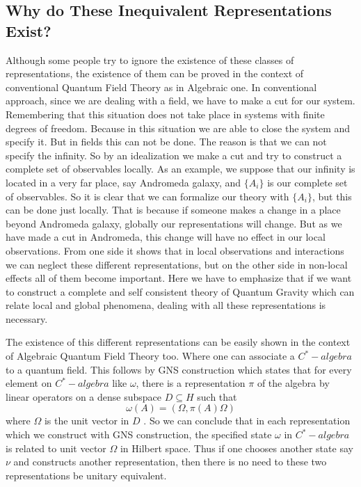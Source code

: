 \documentclass[12pt]{article}
\begin{document}
\subsection{Why do These Inequivalent Representations Exist?}\label{subsection.why UIR exist}
Although some people try to ignore the existence of these classes of representations, the existence of them can be proved in the context of conventional Quantum Field Theory as in Algebraic one.
In conventional approach, since we are dealing with a field, we have to make a cut for our system. Remembering that this situation does not take place in systems with finite degrees of freedom. Because in this situation we are able to close the system and specify it. But in fields this can not be done. The reason is that we can not specify the infinity. So by an idealization we make a cut and try to construct a complete set of observables locally. As an example, we suppose that our infinity is located in a very far place, say Andromeda galaxy, and ${\{A_{i}\}}$ is our complete set of observables. So it is clear that we can formalize our theory with ${\{A_{i}\}}$, but this can be done just locally. That is because if someone makes a change in a place beyond Andromeda galaxy, globally our representations will change. But as we have made a cut in Andromeda, this change will have no effect in our local observations. From one side it shows that in local observations and interactions we can neglect these different representations, but on the other side in non-local effects all of them become important. Here we have to emphasize that if we want to construct a complete and self consistent theory of Quantum Gravity which can relate local and global phenomena, dealing with all these representations is necessary.

The existence of this different representations can be easily shown in the context of Algebraic Quantum Field Theory too. Where one can associate a $ C^*-algebra $ to a quantum field. This follows by GNS construction \cite{citeulike:7477863,Segal} which states that for every element on $ C^*-algebra $ like $\omega$, there is a representation $\pi$ of the algebra by linear operators on a dense subspace $D\subseteq H$ such that
\begin{equation}\label{eqn.GNS}
\omega(A)=(\Omega,\pi(A)\Omega)
\end{equation}
where $\Omega$ is the unit vector in $D$ .
So we can conclude that in each representation which we construct with GNS construction, the specified state $\omega$ in $ C^*-algebra $ is related to unit vector $\Omega$ in Hilbert space. Thus if one chooses another state say $\nu$ and constructs another representation, then there is no need to these two representations be unitary equivalent.
\end{document}
